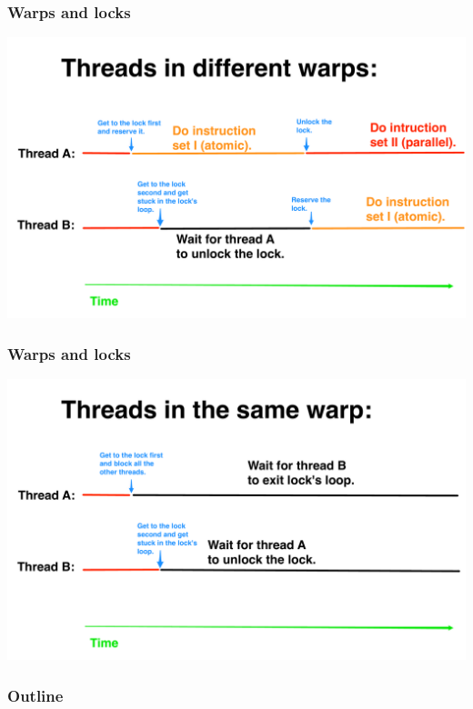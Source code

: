 \documentclass[handout]{beamer}
\numberwithin{equation}{section}
\begin{document}
\begin{frame}
\frametitle{Warps and locks}
 \begin{center}
\includegraphics[scale=.2]{../../fig/lockwarp1}
\end{center}
\end{frame}

\begin{frame}
\frametitle{Warps and locks}
 \begin{center}
\includegraphics[scale=.2]{../../fig/lockwarp2}
\end{center}
\end{frame}

\begin{frame}
\frametitle{Outline}
\tableofcontents
\end{frame}
\end{document}
